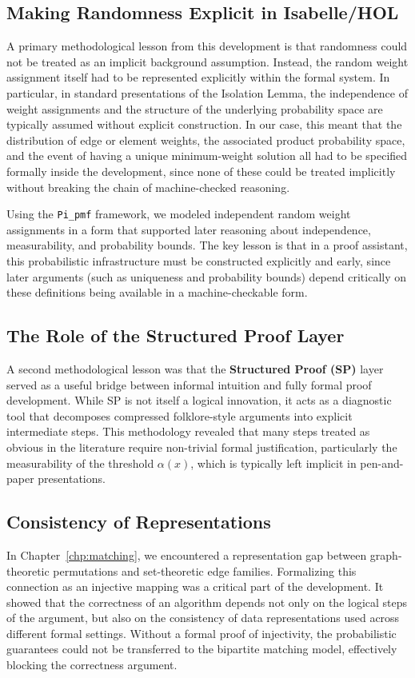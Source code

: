 \subsection{Making Randomness Explicit in Isabelle/HOL}
A primary methodological lesson from this development is that randomness could not be treated as an implicit background assumption.
Instead, the random weight assignment itself had to be represented explicitly within the formal system.
In particular, in standard presentations of the Isolation Lemma, the independence of weight assignments and the structure of the underlying probability space are typically assumed without explicit construction.
In our case, this meant that the distribution of edge or element weights, the associated product probability space, and the event of having a unique minimum-weight solution all had to be specified formally inside the development, since none of these could be treated implicitly without breaking the chain of machine-checked reasoning.

Using the \texttt{Pi\_pmf} framework, we modeled independent random weight assignments in a form that supported later reasoning about independence, measurability, and probability bounds.
The key lesson is that in a proof assistant, this probabilistic infrastructure must be constructed explicitly and early, since later arguments (such as uniqueness and probability bounds) depend critically on these definitions being available in a machine-checkable form.

\subsection{The Role of the Structured Proof Layer}
A second methodological lesson was that the \textbf{Structured Proof (SP)} layer served as a useful bridge between informal intuition and fully formal proof development.
While SP is not itself a logical innovation, it acts as a diagnostic tool that decomposes compressed folklore-style arguments into explicit intermediate steps.
This methodology revealed that many steps treated as obvious in the literature require non-trivial formal justification, particularly the measurability of the threshold $\alpha(x)$, which is typically left implicit in pen-and-paper presentations.

\subsection{Consistency of Representations}
In Chapter~\ref{chp:matching}, we encountered a representation gap between graph-theoretic permutations and set-theoretic edge families.
Formalizing this connection as an injective mapping was a critical part of the development.
It showed that the correctness of an algorithm depends not only on the logical steps of the argument, but also on the consistency of data representations used across different formal settings.
Without a formal proof of injectivity, the probabilistic guarantees could not be transferred to the bipartite matching model, effectively blocking the correctness argument.


